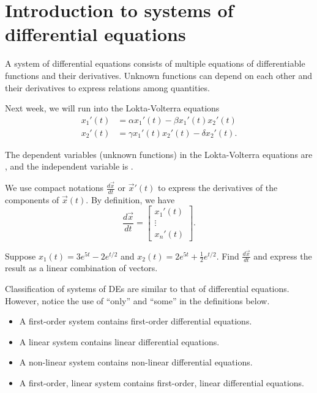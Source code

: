 \documentclass[../main.tex]{subfiles}
\begin{document}
 \section{Introduction to systems of differential equations}

A system of differential equations consists of multiple equations of differentiable functions and their derivatives.  Unknown functions can depend on each other and their derivatives to express relations among quantities.

\begin{example}
  Next week, we will run into the Lokta-Volterra equations
  \begin{align*}
    x_{1}'(t) &= \alpha x_{1}'(t) - \beta x_{1}'(t) x_{2}'(t) \\
    x_{2}'(t) &= \gamma x_{1}'(t) x_{2}'(t) - \delta x_{2}'(t).
  \end{align*}

  The dependent variables (unknown functions) in the Lokta-Volterra equations are \underline{\hspace{1in}}, and the independent variable is \underline{\hspace{1cm}}.
\end{example}

We use compact notations \(\frac{d \vec{x}}{dt}\) or \(\vec{x}'(t)\) to express the derivatives of the components of \(\vec{x}(t)\).   By definition, we have
\[
  \frac{d \vec{x}}{dt} = \begin{bmatrix} x_{1}'(t) \\ \vdots \\ x_{n}'(t)\end{bmatrix}.
\]


\begin{example}
  Suppose \(x_{1}(t) = 3 e^{5t} -2 e^{t/2}\) and \(x_{2}(t) = 2 e^{5t} + \frac{1}{2}e^{t/2}\). Find \(\frac{d \vec{x}}{dt}\) and express the result as a linear combination of vectors.

\end{example}

\faStar{} Classification of systems of DEs are similar to that of differential equations. However, notice the use of ``only'' and ``some'' in the definitions below.
\begin{itemize}
  \item A first-order system contains  first-order differential equations.
  \item A linear system contains   linear differential equations.
  \item A non-linear system contains  non-linear differential equations.
  \item A first-order, linear system contains  first-order, linear differential equations.
\end{itemize}
\end{document}
